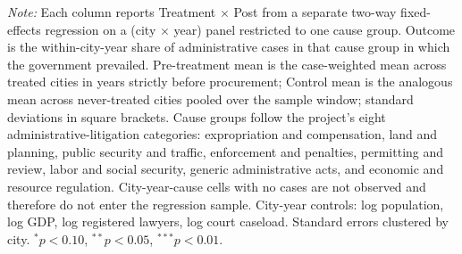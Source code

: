 \begin{table}[!htbp]
\begin{threeparttable}
\begin{tablenotes}[flushleft]
\item \textit{Note:} Each column reports Treatment $\times$ Post from a separate two-way fixed-effects regression on a (city $\times$ year) panel restricted to one cause group. Outcome is the within-city-year share of administrative cases in that cause group in which the government prevailed. Pre-treatment mean is the case-weighted mean across treated cities in years strictly before procurement; Control mean is the analogous mean across never-treated cities pooled over the sample window; standard deviations in square brackets. Cause groups follow the project's eight administrative-litigation categories: expropriation and compensation, land and planning, public security and traffic, enforcement and penalties, permitting and review, labor and social security, generic administrative acts, and economic and resource regulation. City-year-cause cells with no cases are not observed and therefore do not enter the regression sample. City-year controls: log population, log GDP, log registered lawyers, log court caseload. Standard errors clustered by city. $^{*}p<0.10$, $^{**}p<0.05$, $^{***}p<0.01$.
\end{tablenotes}
\end{threeparttable}
\end{table}
